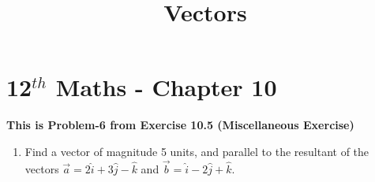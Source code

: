 \documentclass[12pt]{article}
\begin{document}
\begin{center}
\title{\textbf{  Vectors}}
\date{\vspace{-5ex}} %
\maketitle
\end{center}
\setcounter{page}{1}\section{12$^{th}$ Maths - Chapter 10}
\textbf{This is Problem-6 from Exercise 10.5 (Miscellaneous Exercise)}
\begin{enumerate}

\item Find a vector of magnitude 5 units, and parallel to the resultant of the vectors $\overrightarrow{a}=2\hat{i}+3\hat{j}-\hat{k}$ and $\overrightarrow{b}=
\hat{i}-2\hat{j}+\hat{k}.$

\end{enumerate}
\end{document}
